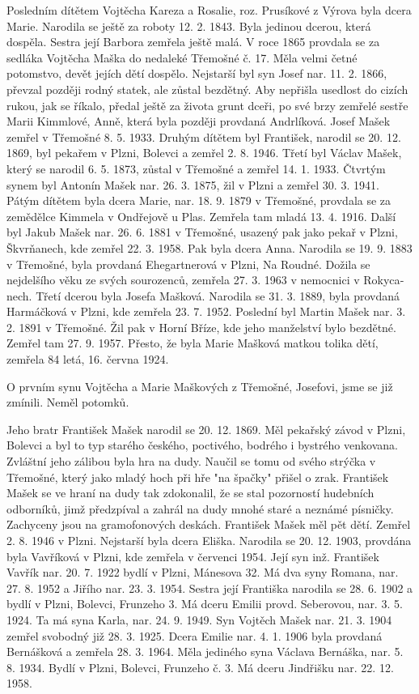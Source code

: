 \documentclass[../dejiny-rodu-prusiku.tex]{subfiles}
\begin{document}
Posledním dítětem Vojtěcha Kareza a Rosalie, roz. Prusíkové z Výrova byla dcera Marie. Narodila se ještě za roboty 12. 2. 1843. Byla jedinou dcerou, která dospěla. Sestra její Barbora zemřela ještě malá. V roce 1865 provdala se za sedláka  Vojtěcha Maška do nedaleké Třemošné č. 17. Měla velmi četné potomstvo, devět jejích dětí dospělo. Nejstarší byl syn Josef nar. 11. 2. 1866, převzal později rodný statek, ale zůstal bezdětný. Aby nepřišla usedlost do cizích rukou, jak se říkalo, předal ještě za života grunt dceři, po své brzy zemřelé sestře Marii Kimmlové, Anně, která byla později provda­ná Andrlíková. Josef Mašek zemřel v Třemošné 8. 5. 1933. Druhým dítětem byl František, narodil se 20. 12. 1869, byl pekařem v Plzni, Bolevci a zemřel 2. 8. 1946. Třetí byl Václav Mašek, který se narodil 6. 5. 1873, zůstal v Třemošné a zemřel 14. 1. 1933. Čtvrtým synem byl Antonín Mašek nar. 26. 3. 1875, žil v Plzni a zemřel 30. 3. 1941. Pátým dítětem byla dcera Marie, nar. 18. 9. 1879 v Třemošné, provdala se za zemědělce Kimmela v Ondřejově u Plas. Zemřela tam mladá 13. 4. 1916. Další byl Jakub Mašek nar. 26. 6. 1881 v Třemošné, usazený pak jako pekař v Plzni, Škvrňanech, kde zemřel 22. 3. 1958. Pak byla dcera Anna. Narodila se 19. 9. 1883 v Třemošné, byla provdaná Ehegartnerová v Plzni, Na Roudné. Dožila se nejdelšího věku ze svých sourozenců, zemřela 27. 3. 1963 v nemocnici v Rokyca­nech. Třetí dcerou byla Josefa Mašková. Narodila se 31. 3. 1889, byla provdaná Harmáčková v Plzni, kde zemřela 23. 7. 1952. Poslední byl Martin Mašek nar. 3. 2. 1891 v Tře­mošné. Žil pak v Horní Bříze, kde jeho manželství by­lo bezdětné. Zemřel tam 27. 9. 1957. Přesto, že byla Marie Mašková matkou tolika dětí, zemřela 84 letá, 16. června 1924.

O prvním synu Vojtěcha a Marie Maškových z Třemošné, Josefovi, jsme se již zmínili. Neměl potomků.

Jeho bratr František Mašek narodil se 20. 12. 1869. Měl pekařský závod v Plzni, Bolevci a byl to typ starého českého, poctivého, bodrého i bystrého venkovana. Zvlášt­ní jeho zálibou byla hra na dudy. Naučil se tomu od své­ho strýčka v Třemošné, který jako mladý hoch při hře "na špačky" přišel o zrak. František Mašek se ve hraní na dudy tak zdokonalil, že se stal pozorností hudebních odborníků, jimž předzpíval a zahrál na dudy mnohé staré a neznámé písničky. Zachyceny jsou na gramofonových deskách. František Mašek měl pět dětí. Zemřel 2. 8. 1946 v Plzni. Nejstarší byla dcera Eliška. Narodila se 20. 12. 1903, provdána byla Vavříková v Plzni, kde zemřela v červenci 1954. Její syn inž. František Vavřík nar. 20. 7. 1922 bydlí v Plzni, Mánesova 32. Má dva syny Romana, nar. 27. 8. 1952 a Jiřího nar. 23. 3. 1954. Sestra její Františka narodila se 28. 6. 1902 a bydlí v Plzni, Bolevci, Frunzeho 3. Má dceru Emilii provd. Seberovou, nar. 3. 5. 1924. Ta má syna Karla, nar. 24. 9. 1949. Syn Vojtěch Mašek nar. 21. 3. 1904 zemřel svobodný již 28. 3. 1925. Dcera Emilie nar. 4. 1. 1906 byla provdaná Bernášková a zemřela 28. 3. 1964. Měla jediného syna Václava Bernáška, nar. 5. 8. 1934. Bydlí v Plzni, Bolevci, Frunzeho č. 3. Má dceru Jindřišku nar. 22. 12. 1958.
\end{document}
